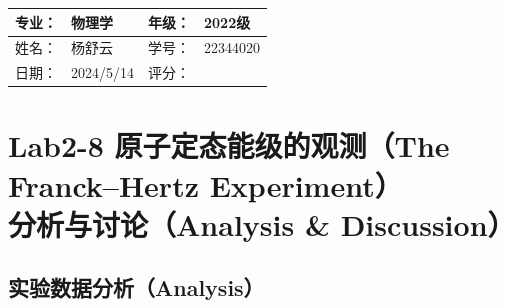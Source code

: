 \documentclass[dvipsnames, svgnames,a4paper,11pt]{article}
\begin{document}
	\clearpage
	
	\begin{table}
		\renewcommand\arraystretch{1.7}
		\begin{tabularx}{\textwidth}{|X|X|X|X|}
			\hline
			专业：& 物理学 &年级：& 2022级\\
			\hline
			姓名： & 杨舒云 & 学号：& 22344020\\
			\hline
			日期：& 2024/5/14 & 评分： &\\
			\hline
		\end{tabularx}
	\end{table}
	
	\section{Lab2-8 原子定态能级的观测（The Franck–Hertz Experiment）\\ \quad\heiti 分析与讨论（Analysis \& Discussion）}
	
	\subsection{实验数据分析（Analysis）}
	
\end{document}
